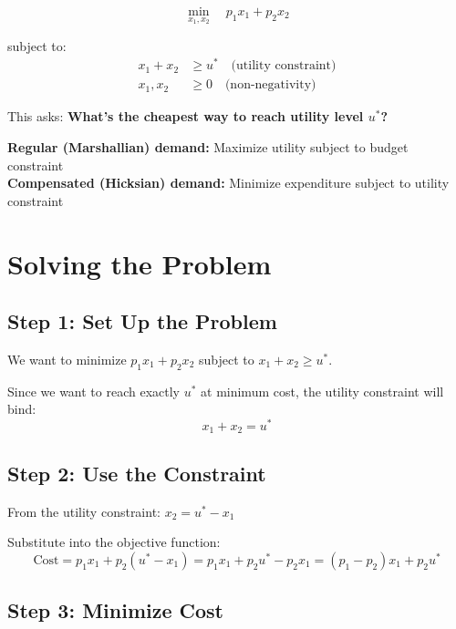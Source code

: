 \documentclass[11pt]{article}
\begin{document}
\begin{equation}
\min_{x_1, x_2} \quad p_1 x_1 + p_2 x_2
\end{equation}

subject to:
\begin{align}
x_1 + x_2 &\geq u^* \quad \text{(utility constraint)} \\
x_1, x_2 &\geq 0 \quad \text{(non-negativity)}
\end{align}

This asks: \textbf{What's the cheapest way to reach utility level $u^*$?}

\begin{tcolorbox}[colback=green!5!white,colframe=green!75!black,title=Key Difference]
\textbf{Regular (Marshallian) demand:} Maximize utility subject to budget constraint \\
\textbf{Compensated (Hicksian) demand:} Minimize expenditure subject to utility constraint
\end{tcolorbox}

\section{Solving the Problem}

\subsection{Step 1: Set Up the Problem}

We want to minimize $p_1 x_1 + p_2 x_2$ subject to $x_1 + x_2 \geq u^*$.

Since we want to reach exactly $u^*$ at minimum cost, the utility constraint will bind:
\begin{equation}
x_1 + x_2 = u^*
\end{equation}

\subsection{Step 2: Use the Constraint}

From the utility constraint: $x_2 = u^* - x_1$

Substitute into the objective function:
\begin{equation}
\text{Cost} = p_1 x_1 + p_2(u^* - x_1) = p_1 x_1 + p_2 u^* - p_2 x_1 = (p_1 - p_2)x_1 + p_2 u^*
\end{equation}

\subsection{Step 3: Minimize Cost}
\end{document}
